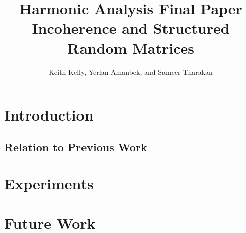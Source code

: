 \documentclass[letterpaper,10pt]{article}
\title{Harmonic Analysis Final Paper \\ Incoherence and Structured Random Matrices}
\author{Keith Kelly, Yerlan Amanbek, and Sameer Tharakan}
\begin{document}
\maketitle
\section{Introduction}


\subsection{Relation to Previous Work}


\section{Experiments}


\section{Future Work}



\nocite{*}

\end{document}
